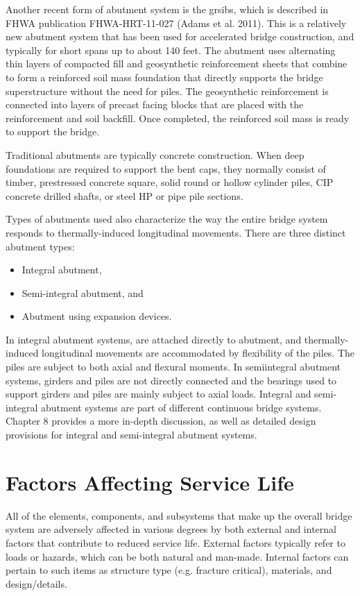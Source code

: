 Another recent form of abutment system is the \acrfull{grsibs}, which is described in FHWA publication FHWA-HRT-11-027 (Adams et al. 2011). This is a relatively new abutment system that has been used for accelerated bridge construction, and typically for short spans up to about 140 feet. The abutment uses alternating thin layers of compacted fill and geosynthetic reinforcement sheets that combine to form a reinforced soil mass foundation that directly supports the bridge superstructure without the need for piles. The geosynthetic reinforcement is connected into layers of precast facing blocks that are placed with the reinforcement and soil backfill. Once completed, the reinforced soil mass is ready to support the bridge.

Traditional abutments are typically concrete construction. When deep foundations are required to support the bent caps, they normally consist of timber, prestressed concrete square, solid round or hollow cylinder piles, CIP concrete drilled shafts, or steel HP or pipe pile sections.

Types of abutments used also characterize the way the entire bridge system responds to thermally-induced longitudinal movements. There are three distinct abutment types:
\begin{itemize}
  \item Integral abutment,
  \item Semi-integral abutment, and
  \item Abutment using expansion devices.
\end{itemize}

In integral abutment systems, are attached directly to abutment, and thermally-induced longitudinal movements are accommodated by flexibility of the piles. The piles are subject to both axial and flexural moments. In semiintegral abutment systems, girders and piles are not directly connected and the bearings used to support girders and piles are mainly subject to axial loads. Integral and semi-integral abutment systems are part of different continuous bridge systems. Chapter 8 provides a more in-depth discussion, as well as detailed design provisions for integral and semi-integral abutment systems.


\section{Factors Affecting Service Life}
\label{sec:factors-affect-sl}

All of the elements, components, and subsystems that make up the overall bridge system are adversely affected in various degrees by both external and internal factors that contribute to reduced service life. External factors typically refer to loads or hazards, which can be both natural and man-made. Internal factors can pertain to such items as structure type (e.g. fracture critical), materials, and design/details.

